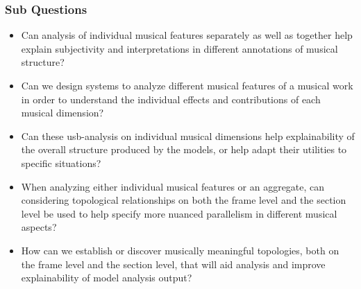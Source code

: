 \subsubsection{Sub Questions}
\begin{itemize}
	\item Can analysis of individual musical features separately as well as together help explain subjectivity and interpretations in different annotations of musical structure?
	\item Can we design systems to analyze different musical features of a musical work in order to understand the individual effects and contributions of each musical dimension? 
	\item Can these usb-analysis on individual musical dimensions help explainability of the overall structure produced by the models, or help adapt their utilities to specific situations?
	\item When analyzing either individual musical features or an aggregate, can considering topological relationships on both the frame level and the section level be used to help specify more nuanced parallelism in different musical aspects?
	\item How can we establish or discover musically meaningful topologies, both on the frame level and the section level, that will aid analysis and improve explainability of model analysis output?
\end{itemize}